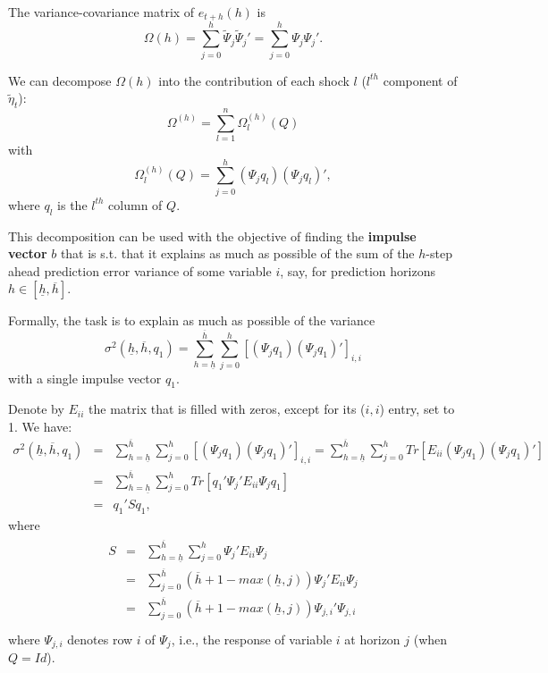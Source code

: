 \documentclass[
  12pt,
]{book}
\theoremstyle{definition}
\theoremstyle{definition}
\theoremstyle{definition}
\theoremstyle{definition}
\theoremstyle{remark}
\begin{document}
The variance-covariance matrix of \(e_{t+h}(h)\) is
\[
\Omega(h)=\sum_{j=0}^h\tilde \Psi_j\tilde \Psi_j'=\sum_{j=0}^h \Psi_j \Psi_j'.
\]

We can decompose \(\Omega(h)\) into the contribution of each shock \(l\) (\(l^{th}\) component of \(\tilde{\eta}_t\)):
\[
\Omega^{(h)}=\sum_{l=1}^n\Omega_l^{(h)}(Q)
\]
with
\[
\Omega_l^{(h)}(Q) =\sum_{j=0}^h(\Psi_jq_l)(\Psi_jq_l)',
\]
where \(q_l\) is the \(l^{th}\) column of \(Q\).

This decomposition can be used with the objective of finding the \textbf{impulse vector} \(b\) that is s.t. that it explains as much as possible of the sum of the \(h\)-step ahead prediction error variance of some variable \(i\), say, for prediction horizons \(h \in [\underline{h} , \overline{h}]\).

Formally, the task is to explain as much as possible of the variance
\[
\sigma^2(\underline{h},\overline{h},q_1)=\sum_{h=\underline{h}}^{\overline{h}} \sum_{j=0}^h\left[(\Psi_jq_1)(\Psi_jq_1)'\right]_{i,i}
\]
with a single impulse vector \(q_1\).

Denote by \(E_{ii}\) the matrix that is filled with zeros, except for its (\(i,i\)) entry, set to 1. We have:
\begin{eqnarray*}
\sigma^2(\underline{h},\overline{h},q_1)&=&\sum_{h=\underline{h}}^{\overline{h}} \sum_{j=0}^h\left[(\Psi_jq_1)(\Psi_jq_1)'\right]_{i,i}=\sum_{h=\underline{h}}^{\overline{h}} \sum_{j=0}^h Tr\left[E_{ii}(\Psi_jq_1)(\Psi_jq_1)'\right]\\
&=&\sum_{h=\underline{h}}^{\overline{h}} \sum_{j=0}^h Tr\left[q_1'\Psi_j'E_{ii}\Psi_j q_1\right]\\
&=& q_1'Sq_1,
\end{eqnarray*}
where
\begin{eqnarray*}
\begin{array}{lll}S&=&\sum_{h=\underline{h}}^{\overline{h}}\sum_{j=0}^{h}\Psi_j'E_{ii}\Psi_j\\
&=&\sum_{j=0}^{\overline{h}}(\overline{h}+1-max(\underline{h},j))\Psi_j'E_{ii}\Psi_j\\
&=&\sum_{j=0}^{\overline{h}}(\overline{h}+1-max(\underline{h},j))\Psi_{j,i}'\Psi_{j,i}\\
\end{array}
\end{eqnarray*}
where \(\Psi_{j,i}\) denotes row \(i\) of \(\Psi_{j}\), i.e., the response of variable \(i\) at horizon \(j\) (when \(Q=Id\)).
\end{document}
